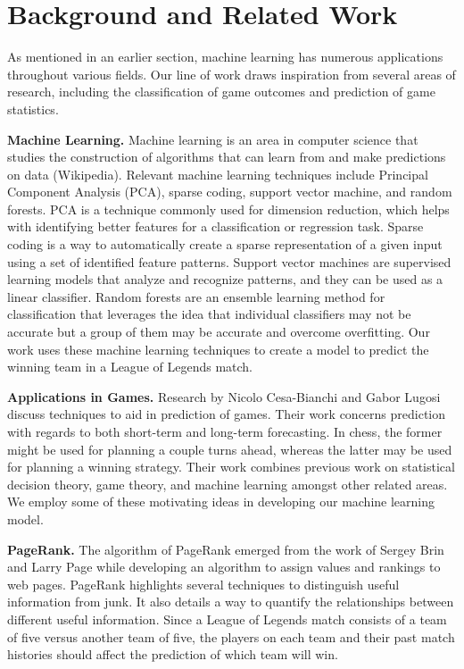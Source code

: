 \section{Background and Related Work}

As mentioned in an earlier section, machine learning has numerous applications
throughout various fields.  Our line of work draws inspiration from 
several areas of research, including the classification of game outcomes and 
prediction of game statistics.  

\textbf{Machine Learning. }  
Machine learning is an area in computer science that studies the construction of 
algorithms that can learn from and make predictions on data (Wikipedia).  
Relevant machine learning techniques include Principal Component Analysis (PCA), 
sparse coding, support vector machine, and random forests.  PCA is a technique 
commonly used for dimension reduction, which helps with identifying better features 
for a classification or regression task. Sparse coding is a way to automatically 
create a sparse representation of a given input using a set of identified feature 
patterns.  Support vector machines are supervised learning models that analyze and 
recognize patterns, and they can be used as a linear classifier.  Random forests 
are an ensemble learning method for classification that leverages the idea that 
individual classifiers may not be accurate but a group of them may be accurate and 
overcome overfitting.  Our work uses these machine learning techniques to create a 
model to predict the winning team in a League of Legends match.

\textbf{Applications in Games.  }
Research by Nicolo Cesa-Bianchi and Gabor Lugosi discuss techniques to aid in 
prediction of games.  Their work concerns prediction with regards to both 
short-term and long-term forecasting.  In chess, the former might be used for 
planning a couple turns 
ahead, whereas the latter may be used for planning a winning strategy.  Their work 
combines previous work on statistical decision theory, game theory, and machine learning 
amongst other related areas.  We employ some of these motivating ideas in developing our
machine learning model.  

\textbf{PageRank.  }
The algorithm of PageRank emerged from the work of Sergey Brin and Larry 
Page while developing an algorithm to assign values and rankings to web pages.  
PageRank highlights several techniques to distinguish useful information 
from junk.  It also details a way to quantify the relationships between different 
useful information.  Since a League of Legends match consists of a team of five versus 
another team of five, the players on each team and their past match histories should 
affect the prediction of which team will win.  

